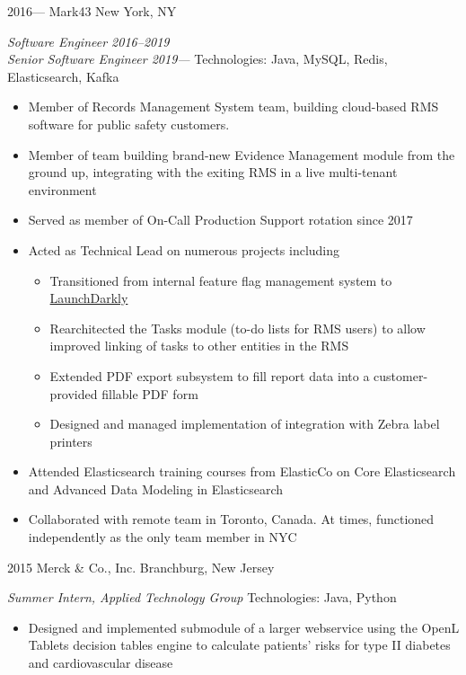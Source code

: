 \documentclass[]{friggeri-mlg-cv} %
\begin{document}
\begin{entrylist}
\entry
{2016---}
{Mark43}
{New York, NY}
{\emph{Software Engineer 2016--2019}\\
\emph{Senior Software Engineer 2019---}
Technologies: Java, MySQL, Redis, Elasticsearch, Kafka
\begin{itemize}[leftmargin=*]
\item Member of Records Management System team, building cloud-based RMS software
for public safety customers.
\item Member of team building brand-new Evidence Management module from the 
ground up, integrating with the exiting RMS in a live multi-tenant environment
\item Served as member of On-Call Production Support rotation since 2017
\item Acted as Technical Lead on numerous projects including
\begin{itemize}
\item Transitioned from internal feature flag management system to 
\href{https://launchdarkly.com}{LaunchDarkly}
\item Rearchitected the Tasks module (to-do lists for RMS users) to allow 
improved linking of tasks to other entities in the RMS
\item Extended PDF export subsystem to fill report data into a customer-provided
fillable PDF form
\item Designed and managed implementation of integration with Zebra label printers
\end{itemize}
\item Attended Elasticsearch training courses from ElasticCo on Core Elasticsearch
and Advanced Data Modeling in Elasticsearch
\item Collaborated with remote team in Toronto, Canada.  At times, functioned 
independently as the only team member in NYC
\end{itemize}}
\entry
{2015}
{Merck \& Co., Inc.}
{Branchburg, New Jersey}
{\emph{Summer Intern, Applied Technology Group}
Technologies: Java, Python
\begin{itemize}[leftmargin=*]
\item Designed and implemented submodule of a larger webservice using the OpenL 
Tablets decision tables engine to calculate patients' risks for type II diabetes
and cardiovascular disease

\end{itemize}}
\end{entrylist}
\end{document}
